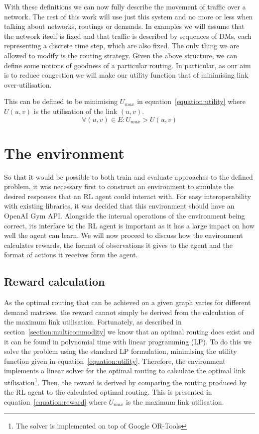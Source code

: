 With these definitions we can now fully describe the movement of traffic over a network. The rest of this work will use just this system and no more or less when talking about networks, routings or demands. In examples we will assume that the network itself is fixed and that traffic is described by sequences of DMs, each representing a discrete time step, which are also fixed. The only thing we are allowed to modify is the routing strategy. Given the above structure, we can define some notions of goodness of a particular routing. In particular, as our aim is to reduce congestion we will make our utility function that of minimising link over-utilisation.

This can be defined to be minimising $U_{max}$ in equation~\ref{equation:utility} where $U(u,v)$ is the utilisation of the link $(u,v)$.
\begin{equation}
  \label{equation:utility}
  \forall (u,v) \in E: U_{max} > U(u,v)
\end{equation}


\section{The environment}
So that it would be possible to both train and evaluate approaches to the defined problem, it was necessary first to construct an environment to simulate the desired responses that an RL agent could interact with. For easy interoperability with existing libraries, it was decided that this environment should have an OpenAI Gym\cite{brockman2016openai} API. Alongside the internal operations of the environment being correct, its interface to the RL agent is important as it has a large impact on how well the agent can learn. We will now proceed to discuss how the environment calculates rewards, the format of observations it gives to the agent and the format of actions it receives form the agent.

\subsection{Reward calculation}
As the optimal routing that can be achieved on a given graph varies for different demand matrices, the reward cannot simply be derived from the calculation of the maximum link utilisation. Fortunately, as described in section~\ref{section:multicommodity} we know that an optimal routing does exist and it can be found in polynomial time with linear programming (LP). To do this we solve the problem using the standard LP formulation, minimising the utility function given in equation~\ref{equation:utility}. Therefore, the environment implements a linear solver for the optimal routing to calculate the optimal link utilisation\footnote{The solver is implemented on top of Google OR-Tools\cite{ortools}}. Then, the reward is derived by comparing the routing produced by the RL agent to the calculated optimal routing. This is presented in equation~\ref{equation:reward} where $U_{max}$ is the maximum link utilisation.

